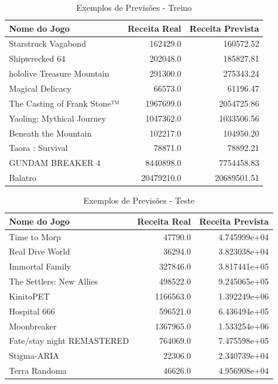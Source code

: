 \documentclass[12pt]{article}
\begin{document}
\begin{table} %
\centering  %
\caption{Exemplos de Previsões - Treino} %
\begin{tabular}{lrr} %
\toprule  %
Nome do Jogo & Receita Real & Receita Prevista \\ %
\midrule  %
        Starstruck Vagabond &   162429.0 &   160572.52 \\
             Shipwrecked 64 &   202048.0 &   185827.81\\
 hololive Treasure Mountain &   291300.0 &   275343.24\\
           Magical Delicacy &    66573.0 &    61196.47\\
The Casting of Frank Stone™ &  1967699.0 &  2054725.86\\
  Yaoling: Mythical Journey &  1047362.0 &  1033506.56\\
       Beneath the Mountain &   102217.0 &   104950.20\\
           Taora : Survival &    78871.0 &    78892.21\\
           GUNDAM BREAKER 4 &  8440898.0 &  7754458.83\\
                    Balatro & 20479210.0 & 20689501.51\\
\bottomrule  %
\end{tabular}
\end{table}


\begin{table} %
\centering  %
\caption{Exemplos de Previsões - Teste} %
\begin{tabular}{lrr} %
\toprule  %
Nome do Jogo & Receita Real & Receita Prevista \\ %
\midrule  %
              Time to Morp &   47790.0 & 4.745999e+04 \\
           Real Dive World &   36294.0 & 3.823038e+04 \\
           Immortal Family &  327846.0 & 3.817441e+05 \\
  The Settlers: New Allies &  498522.0 & 9.245065e+05 \\
                 KinitoPET & 1166563.0 & 1.392249e+06 \\
              Hospital 666 &  596521.0 & 6.436494e+05 \\
               Moonbreaker & 1367965.0 & 1.533254e+06 \\
Fate/stay night REMASTERED &  764069.0 & 7.475598e+05 \\
               Stigma-ARIA &   22306.0 & 2.340739e+04 \\
             Terra Randoma &   46626.0 & 4.956908e+04 \\
\bottomrule  %
\end{tabular}
\end{table}
\end{document}
